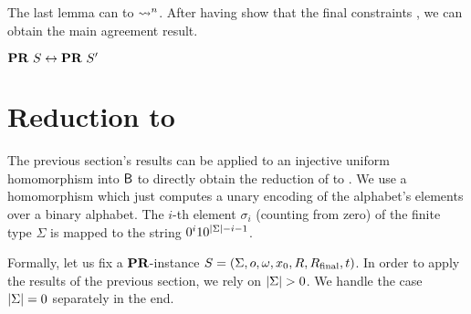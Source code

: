 

The last lemma can   to $\rightsquigarrow_{}^n$.
After having show that the final constraints , we can obtain the main agreement result.
\begin{theorem}\label{thm:hom_pr_equiv}
  $\textbf{PR}{}~S \leftrightarrow \textbf{PR}{}~S'$
\end{theorem}

\section{Reduction to \BPR{}}
The previous section's results can be applied to an injective uniform homomorphism into $\textsf{B}$ to directly obtain the reduction of \PR{} to \BPR{}. 
We use a homomorphism which just computes a unary encoding of the alphabet's elements over a binary alphabet. The $i$-th element $\sigma_i$ (counting from zero) of the finite type $\Sigma$ is mapped to the string $0^i10^{|\Sigma|-i-1}$.

Formally, let us fix a $\textbf{PR}{}$-instance $S = (\Sigma, o, \omega, x_0, R, R_{\text{final}}, t)$. In order to apply the results of the previous section, we rely on $|\Sigma| > 0$. We handle the case $|\Sigma| = 0$ separately in the end.


